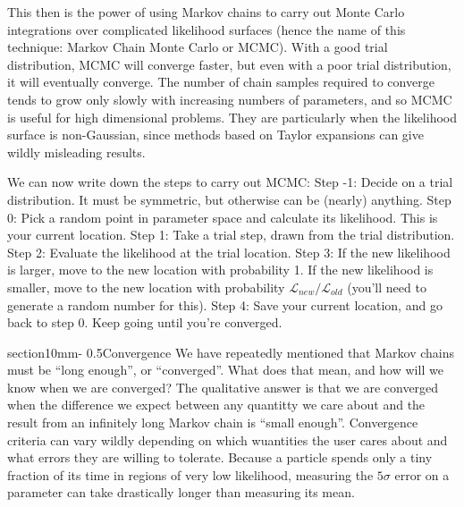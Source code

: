 \documentclass[letterpaper,11pt,preprint]{aastex}
\makeatletter
\renewcommand{\section}{\@startsection%
{section}{1}{0mm}{-\baselineskip}%
{0.5\baselineskip}{\normalfont\Large\bfseries}}%
\makeatother
\begin{document}
This then is the power of using Markov chains to carry out Monte Carlo
integrations over complicated likelihood surfaces (hence the name of
this technique: Markov Chain Monte Carlo or MCMC).  With a good trial
distribution, MCMC will converge faster, but even with a poor trial
distribution, it will eventually converge.  The number of chain
samples required to converge tends to grow only slowly with increasing
numbers of parameters, and so MCMC is useful for high dimensional
problems.  They are particularly when the likelihood surface is
non-Gaussian, since methods based on Taylor expansions can give wildly
misleading results.  

We can now write down the steps to carry out MCMC:\newline
Step -1:  Decide on a trial distribution.  It must be symmetric, but
otherwise can be (nearly) anything.\newline
Step 0: Pick a random point in parameter space and calculate its
likelihood.  This is your current location.\newline
Step 1: Take a trial step, drawn from the trial distribution. \newline
Step 2: Evaluate the likelihood at the trial location.  \newline
Step 3: If the new likelihood is larger, move to the new location with
probability 1.  If the new likelihood is smaller, move to the new
location with probability $\mathcal{L}_{new}/\mathcal{L}_{old}$
(you'll need to generate a random number for this).\newline
Step 4:  Save your current location, and go back to step 0.\newline
Keep going until you're converged.

\section{Convergence}
We have repeatedly mentioned that Markov chains must be ``long
enough'', or ``converged''.  What does that mean, and how will we know
when we are converged?  The qualitative answer is that we are
converged when the difference we expect between any quantitty we care
about and the result from an infinitely long Markov chain is ``small
enough''.  Convergence criteria can vary wildly depending on which
wuantities the user cares about and what errors they are willing to
tolerate.  Because a particle spends only a tiny fraction of its time
in regions of very low likelihood, measuring the $5\sigma$ error on a
parameter can take drastically longer than measuring its mean.  
\end{document}
